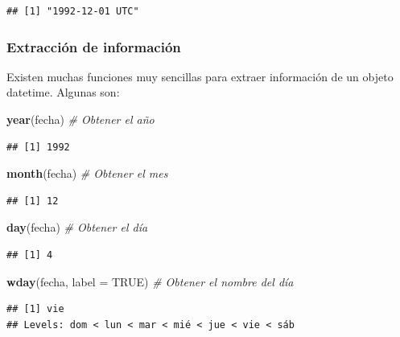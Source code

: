 \documentclass[]{book}
\newenvironment{Shaded}{\begin{snugshade}}{\end{snugshade}}
\newcommand{\CommentTok}[1]{\textcolor[rgb]{0.56,0.35,0.01}{\textit{#1}}}
\newcommand{\DataTypeTok}[1]{\textcolor[rgb]{0.13,0.29,0.53}{#1}}
\newcommand{\KeywordTok}[1]{\textcolor[rgb]{0.13,0.29,0.53}{\textbf{#1}}}
\newcommand{\NormalTok}[1]{#1}
\newcommand{\OtherTok}[1]{\textcolor[rgb]{0.56,0.35,0.01}{#1}}
\begin{document}
\begin{verbatim}
## [1] "1992-12-01 UTC"
\end{verbatim}

\hypertarget{extraccion-de-informacion}{%
\subsubsection{Extracción de información}\label{extraccion-de-informacion}}

Existen muchas funciones muy sencillas para extraer información de un objeto datetime. Algunas son:

\begin{Shaded}
\begin{Highlighting}[]
\KeywordTok{year}\NormalTok{(fecha)  }\CommentTok{# Obtener el año}
\end{Highlighting}
\end{Shaded}

\begin{verbatim}
## [1] 1992
\end{verbatim}

\begin{Shaded}
\begin{Highlighting}[]
\KeywordTok{month}\NormalTok{(fecha) }\CommentTok{# Obtener el mes}
\end{Highlighting}
\end{Shaded}

\begin{verbatim}
## [1] 12
\end{verbatim}

\begin{Shaded}
\begin{Highlighting}[]
\KeywordTok{day}\NormalTok{(fecha)   }\CommentTok{# Obtener el día}
\end{Highlighting}
\end{Shaded}

\begin{verbatim}
## [1] 4
\end{verbatim}

\begin{Shaded}
\begin{Highlighting}[]
\KeywordTok{wday}\NormalTok{(fecha, }\DataTypeTok{label =} \OtherTok{TRUE}\NormalTok{) }\CommentTok{# Obtener el nombre del día}
\end{Highlighting}
\end{Shaded}

\begin{verbatim}
## [1] vie
## Levels: dom < lun < mar < mié < jue < vie < sáb
\end{verbatim}
\end{document}
